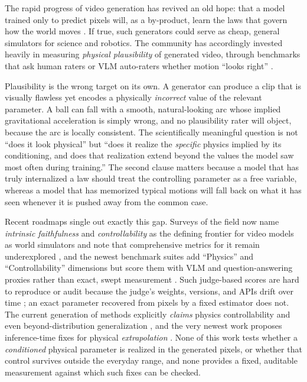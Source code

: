 \documentclass[10pt,twocolumn,letterpaper]{article}
\begin{document}
The rapid progress of video generation has revived an old hope: that a model
trained only to predict pixels will, as a by-product, learn the laws that
govern how the world moves \citep{brooks2024sora,agarwal2025cosmos}. If true,
such generators could serve as cheap, general simulators for science and
robotics. The community has accordingly invested heavily in measuring
\emph{physical plausibility} of generated video, through benchmarks that ask
human raters or VLM auto-raters whether motion ``looks right''
\citep{bansal2024videophy,bansal2025videophy2,meng2024phygenbench,motamed2025physicsiq,zhang2025morpheus,phyworldbench2025}.

Plausibility is the wrong target on its own. A generator can produce a clip
that is visually flawless yet encodes a physically \emph{incorrect} value of
the relevant parameter. A ball can fall with a smooth, natural-looking arc
whose implied gravitational acceleration is simply wrong, and no plausibility
rater will object, because the arc is locally consistent. The scientifically
meaningful question is not ``does it look physical'' but ``does it realize the
\emph{specific} physics implied by its conditioning, and does that realization
extend beyond the values the model saw most often during training.'' The
second clause matters because a model that has truly internalized a law should
treat the controlling parameter as a free variable, whereas a model that has
memorized typical motions will fall back on what it has seen whenever it is
pushed away from the common case.

Recent roadmaps single out exactly this gap. Surveys of the field now name
\emph{intrinsic faithfulness} and \emph{controllability} as the defining
frontier for video models as world simulators and note that comprehensive
metrics for it remain underexplored
\citep{roadmap2025visualworld,evolution2026videogen}, and the newest
benchmark suites add ``Physics'' and ``Controllability'' dimensions but score
them with VLM and question-answering proxies rather than exact, swept
measurement \citep{vbench2_2025,t2vphysbench2025,likephys2025}. Such judge-based
scores are hard to reproduce or audit because the judge's weights, versions, and
APIs drift over time \citep{phyground2026}; an exact parameter recovered from
pixels by a fixed estimator does not. The current generation of methods
explicitly \emph{claims} physics controllability and even
beyond-distribution generalization
\citep{physchoreo2025,phantom2026,physvideo2026,phyco2026,motionforcing2026}, and
the very newest work proposes inference-time fixes for physical
\emph{extrapolation} \citep{lapg2026}. None of this work tests whether a
\emph{conditioned} physical parameter is realized in the generated pixels, or
whether that control survives outside the everyday range, and none provides a
fixed, auditable measurement against which such fixes can be checked.
\end{document}
